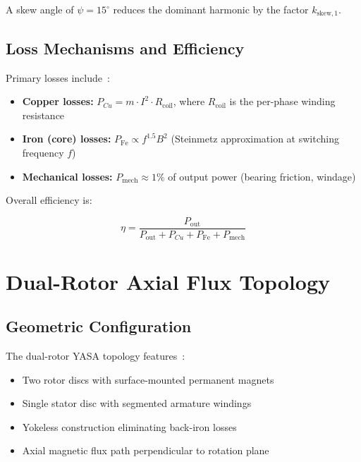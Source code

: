 \documentclass[12pt,a4paper]{article}
\begin{document}
A skew angle of $\psi = 15^{\circ}$ reduces the dominant harmonic by the factor $k_{\text{skew},1}$.

\subsection{Loss Mechanisms and Efficiency}
Primary losses include~\cite{ref34,ref35}:

\begin{itemize}
\item \textbf{Copper losses:} $P_{Cu} = m \cdot I^2 \cdot R_{\text{coil}}$, where $R_{\text{coil}}$ is the per-phase winding resistance
\item \textbf{Iron (core) losses:} $P_{\text{Fe}} \propto f^{1.5} B^2$ (Steinmetz approximation at switching frequency $f$)
\item \textbf{Mechanical losses:} $P_{\text{mech}} \approx 1\%$ of output power (bearing friction, windage)
\end{itemize}

Overall efficiency is:

\begin{equation}
\eta = \frac{P_{\text{out}}}{P_{\text{out}} + P_{Cu} + P_{\text{Fe}} + P_{\text{mech}}}
\label{eq:efficiency}
\end{equation}

\section{Dual-Rotor Axial Flux Topology}
\subsection{Geometric Configuration}
The dual-rotor YASA topology features~\cite{ref10,ref28,ref29}:

\begin{itemize}
\item Two rotor discs with surface-mounted permanent magnets
\item Single stator disc with segmented armature windings
\item Yokeless construction eliminating back-iron losses
\item Axial magnetic flux path perpendicular to rotation plane
\end{itemize}
\end{document}
